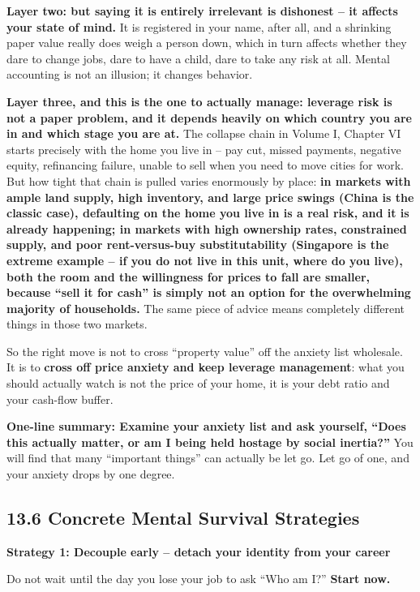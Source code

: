 \documentclass[11pt,a4paper]{article}
\begin{document}
\textbf{Layer two: but saying it is entirely irrelevant is dishonest -- it affects your state of mind.} It is registered in your name, after all, and a shrinking paper value really does weigh a person down, which in turn affects whether they dare to change jobs, dare to have a child, dare to take any risk at all. Mental accounting is not an illusion; it changes behavior.

\textbf{Layer three, and this is the one to actually manage: leverage risk is not a paper problem, and it depends heavily on which country you are in and which stage you are at.} The collapse chain in Volume I, Chapter VI starts precisely with the home you live in -- pay cut, missed payments, negative equity, refinancing failure, unable to sell when you need to move cities for work. But how tight that chain is pulled varies enormously by place: \textbf{in markets with ample land supply, high inventory, and large price swings (China is the classic case), defaulting on the home you live in is a real risk, and it is already happening; in markets with high ownership rates, constrained supply, and poor rent-versus-buy substitutability (Singapore is the extreme example -- if you do not live in this unit, where do you live), both the room and the willingness for prices to fall are smaller, because ``sell it for cash'' is simply not an option for the overwhelming majority of households.} The same piece of advice means completely different things in those two markets.

So the right move is not to cross ``property value'' off the anxiety list wholesale. It is to \textbf{cross off price anxiety and keep leverage management}: what you should actually watch is not the price of your home, it is your debt ratio and your cash-flow buffer.

\textbf{One-line summary: Examine your anxiety list and ask yourself, ``Does this actually matter, or am I being held hostage by social inertia?''} You will find that many ``important things'' can actually be let go. Let go of one, and your anxiety drops by one degree.

\subsection{13.6 Concrete Mental Survival Strategies}

\textbf{Strategy 1: Decouple early -- detach your identity from your career}

Do not wait until the day you lose your job to ask ``Who am I?'' \textbf{Start now.}
\end{document}
